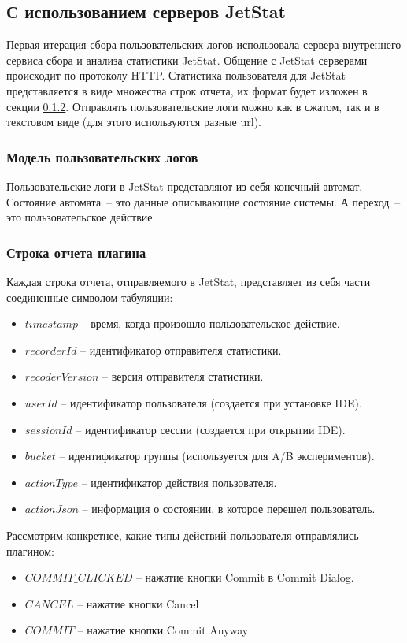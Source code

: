 \documentclass[times]{itmo-student-thesis}
\begin{document}
\subsection{С использованием серверов JetStat}
Первая итерация сбора пользовательских логов использовала сервера внутреннего сервиса сбора и анализа статистики JetStat. Общение с JetStat серверами происходит по протоколу HTTP. Статистика пользователя для JetStat представляется в виде множества строк отчета, их формат будет изложен в секции \ref{report-line}. Отправлять пользовательские логи можно как в сжатом, так и в текстовом виде (для этого используются разные url).
\subsubsection{Модель пользовательских логов}
Пользовательские логи в JetStat представляют из себя конечный автомат. Состояние автомата~-- это данные описывающие состояние системы. А переход~-- это пользовательское действие.
\subsubsection{Строка отчета плагина}\label{report-line}
Каждая строка отчета, отправляемого в JetStat, представляет из себя части соединенные символом табуляции:
    \begin{itemize}[label={\textbullet}]
        \item $timestamp$ -- время, когда произошло пользовательское действие.
        \item $recorderId$ -- идентификатор отправителя статистики.
        \item $recoderVersion$ -- версия отправителя статистики.
        \item $userId$ -- идентификатор пользователя (создается при установке IDE).
        \item $sessionId$ -- идентификатор сессии (создается при открытии IDE).
        \item $bucket$ -- идентификатор группы (используется для A/B экспериментов).
        \item $actionType$ -- идентификатор действия пользователя.
        \item $actionJson$ -- информация о состоянии, в которое перешел пользователь.
    \end{itemize}

Рассмотрим конкретнее, какие типы действий пользователя отправлялись плагином:
    \begin{itemize}[label={\textbullet}]
        \item $COMMIT\_CLICKED$ -- нажатие кнопки Commit в Commit Dialog.
        \item $CANCEL$ -- нажатие кнопки Cancel
        \item $COMMIT$ -- нажатие кнопки Commit Anyway
    \end{itemize}
\end{document}
